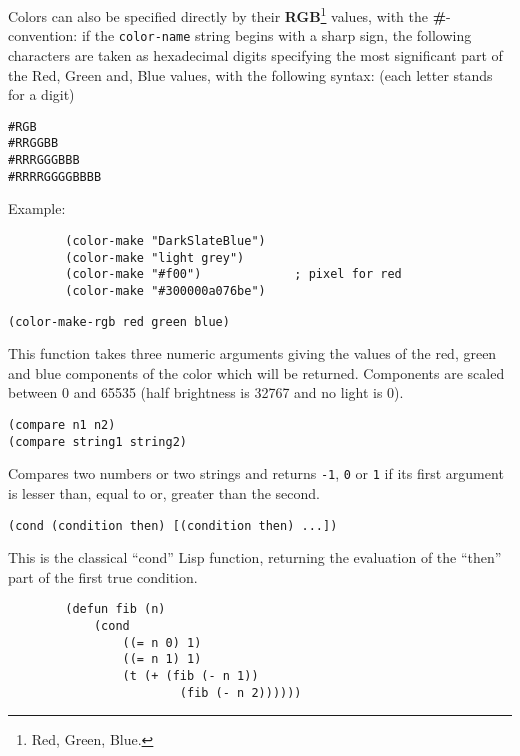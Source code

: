 Colors can also be specified directly by their {\bf RGB}\footnote{Red,
Green, Blue.} values, with the {\bf\#}-convention: if the \verb"color-name"
string begins with a sharp sign, the following characters are taken as
hexadecimal digits specifying the most significant part of the Red, Green
and, Blue values, with the following syntax: (each letter stands for a digit)

\begin{verbatim}
#RGB
#RRGGBB
#RRRGGGBBB
#RRRRGGGGBBBB
\end{verbatim}

Example:{\exemplefont\upspace\begin{verbatim}
        (color-make "DarkSlateBlue")
        (color-make "light grey")
        (color-make "#f00")             ; pixel for red
        (color-make "#300000a076be")
\end{verbatim}}


{\usagefont\begin{verbatim}
(color-make-rgb red green blue)
\end{verbatim}}\usageupspace

This function takes three numeric arguments giving the values of the red,
green and blue components of the color which will be returned. Components are
scaled between 0 and 65535 (half brightness is 32767 and no light is 0).


{\usagefont\begin{verbatim}
(compare n1 n2)
(compare string1 string2)
\end{verbatim}}\usageupspace

Compares two numbers or two strings and returns \verb"-1", \verb"0" or
\verb"1" if its first argument is lesser than, equal to or, greater than the
second.

        
{\usagefont\begin{verbatim}
(cond (condition then) [(condition then) ...])
\end{verbatim}}\usageupspace

This is the classical ``cond'' Lisp function, returning the evaluation of the
``then'' part of the first true condition.

{\exemplefont\begin{verbatim}
        (defun fib (n)
            (cond
                ((= n 0) 1)
                ((= n 1) 1)
                (t (+ (fib (- n 1)) 
                        (fib (- n 2))))))
\end{verbatim}}

